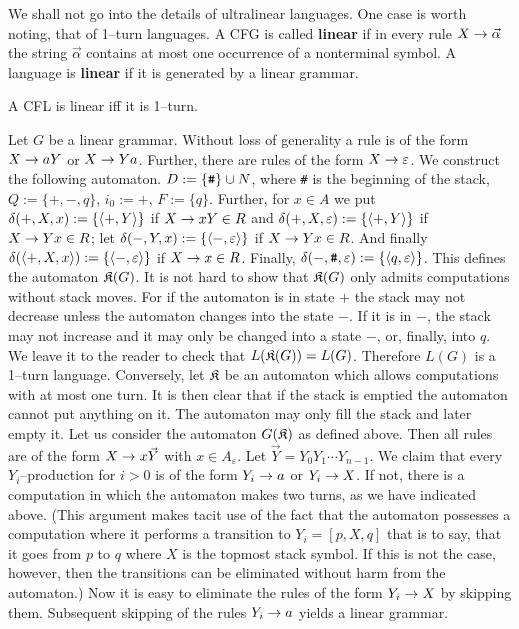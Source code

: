 We shall not go into the details of ultralinear languages.
One case is worth noting, that of 1--turn languages.
A CFG is called \textbf{linear} if in every rule
$X \rightarrow \vec{\alpha}$ the string $\vec{\alpha}$ contains at most one
occurrence of a nonterminal symbol. A language is \textbf{linear}
if it is generated by a linear grammar.
\begin{thm}
A CFL is linear iff it is
1--turn.
\end{thm}
\proofbeg
Let $G$ be a linear grammar. Without loss of generality
a rule is of the form $X \rightarrow aY$ or $X \rightarrow Ya$. Further,
there are rules of the form $X \rightarrow \varepsilon$. We construct
the following automaton. $D := \{\mbox{\tt \#}\} \cup N$, where 
{\tt \#} is the beginning of the stack, $Q := \{+, -, q\}$,
$i_0 := +$, $F := \{q\}$. Further, for
$x \in A$ we put $\delta(+, X, x) := \{\langle +, Y\rangle\}$
if $X \rightarrow xY \in R$ and $\delta(+, X, \varepsilon) := 
\{\langle +, Y\rangle\}$ if $X \rightarrow Yx \in R$; let
$\delta(-, Y, x) := \{\langle -, \varepsilon\rangle\}$
if $X \rightarrow Yx \in R$. And finally $\delta(\langle +, X, x\rangle) := 
\{\langle -, \varepsilon\rangle\}$ if $X \rightarrow x \in R$. Finally, 
$\delta(-,\mbox{\tt \#},\varepsilon) := \{\langle q, \varepsilon\rangle\}$.  
This defines the automaton $\mathfrak{K}(G)$. It is not hard to show that 
$\mathfrak{K}(G)$ only admits computations
without stack moves. For if the automaton is in state 
$+$ the stack may not decrease unless the automaton changes
into the state $-$. If it is in $-$, the stack may not increase 
and it may only be changed into a state $-$, or, finally, into 
$q$. We leave it to the reader to check that
$L(\mathfrak{K}(G)) = L(G)$. Therefore $L(G)$ is a 1--turn language.
Conversely, let $\mathfrak{K}$ be an automaton which allows computations
with at most one turn. It is then clear that if the stack is
emptied the automaton cannot put anything on it.
The automaton may only fill the stack and later empty it.
Let us consider the automaton $G(\mathfrak{K})$ as defined above.
Then all rules are of the form $X \rightarrow x\vec{Y}$ with
$x \in A_{\varepsilon}$. Let $\vec{Y} =
Y_0 Y_1 \dotsb Y_{n-1}$. We claim that every
$Y_i$--production for $i > 0$ is of the form $Y_i \rightarrow a$
or $Y_i \rightarrow X$. If not,  there is a computation in which
the automaton makes two turns, as we have indicated above.
(This argument makes tacit use of the fact that the automaton
possesses a computation where it performs a transition to
$Y_i = [p,X,q]$ that is to say, that it goes from
$p$ to $q$ where $X$ is the topmost stack symbol. If this
is not the case, however, then the transitions can be
eliminated without harm from the automaton.) Now it is easy
to eliminate the rules of the form $Y_i \rightarrow X$ by skipping them.
Subsequent skipping of the rules $Y_i \rightarrow a$ yields a
linear grammar.
\proofend

